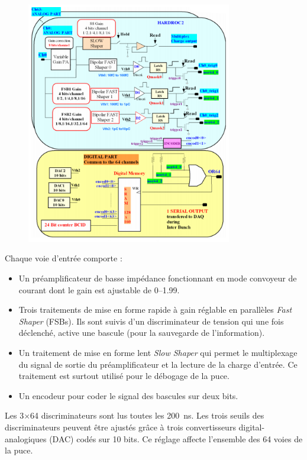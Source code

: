 \begin{figure}[ht!]
	\centering
	\includegraphics[width=0.8\textwidth]{GLA/scheme.png}
	\label{scheme}
\end{figure}

Chaque voie d'entrée comporte :
\begin{itemize}[label=$\bullet$]
	\item Un préamplificateur de basse impédance fonctionnant en mode convoyeur de courant dont le gain est ajustable de \SIrange{0}{1.99}{}.
	\item Trois traitements de mise en forme rapide à gain réglable en parallèles \textit{Fast Shaper} (FSBs). Ils sont suivis d'un discriminateur de tension qui une fois déclenché, active une bascule (pour la sauvegarde de l'information).
	\item Un traitement de mise en forme lent \textit{Slow Shaper} qui permet le multiplexage du signal de sortie du préamplificateur et la lecture de la charge d'entrée. Ce traitement est surtout utilisé pour le débogage de la puce.
	\item Un encodeur pour coder le signal des bascules sur deux bits.
\end{itemize}

Les \num{3}$\times$\num{64} discriminateurs sont lus toutes les \SI{200}{\nano\second}. Les trois seuils des discriminateurs peuvent être ajustés grâce à trois convertisseurs digital-analogiques (DAC) codés sur \num{10} bits. Ce réglage affecte l'ensemble des \num{64} voies de la puce.

